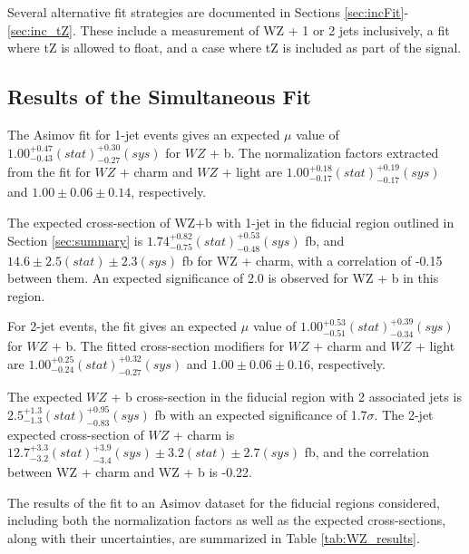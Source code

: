 Several alternative fit strategies are documented in Sections \ref{sec:incFit}-\ref{sec:inc_tZ}. These include a measurement of WZ + 1 or 2 jets inclusively, a fit where tZ is allowed to float, and a case where tZ is included as part of the signal.

\subsection{Results of the Simultaneous Fit}
\label{sec:resSum}

The Asimov fit for 1-jet events gives an expected $\mu$ value of $1.00^{+0.47}_{-0.43}(stat)^{+0.30}_{-0.27}(sys)$ for $WZ$ + b. The normalization factors extracted from the fit for $WZ$ + charm and $WZ$ + light are $1.00^{+0.18}_{-0.17}(stat)^{+0.19}_{-0.17}(sys)$ and $1.00 \pm 0.06 \pm 0.14 $, respectively.

The expected cross-section of WZ+b with 1-jet in the fiducial region outlined in Section \ref{sec:summary} is $1.74^{+0.82}_{-0.75}(stat)^{+0.53}_{-0.48}(sys)$ fb, and $14.6 \pm 2.5 (stat) \pm 2.3 (sys)$ fb for WZ + charm, with a correlation of -0.15 between them. An expected significance of 2.0 is observed for WZ + b in this region. 

For 2-jet events, the fit gives an expected $\mu$ value of $1.00^{+0.53}_{-0.51}(stat)^{+0.39}_{-0.34}(sys)$ for $WZ$ + b. The fitted cross-section modifiers for $WZ$ + charm and $WZ$ + light are $1.00^{+0.25}_{-0.24}(stat)^{+0.32}_{-0.27}(sys)$ and $1.00 \pm 0.06 \pm 0.16 $, respectively.

The expected $WZ$ + b cross-section in the fiducial region with 2 associated jets is $2.5^{+1.3}_{-1.3}(stat)^{+0.95}_{-0.83}(sys)$ fb with an expected significance of 1.7$\sigma$. The 2-jet expected cross-section of $WZ$ + charm is $12.7^{+3.3}_{-3.2}(stat)^{+3.9}_{-3.4}(sys) \pm 3.2 (stat) \pm 2.7 (sys)$ fb, and the correlation between WZ + charm and WZ + b is -0.22. 

The results of the fit to an Asimov dataset for the fiducial regions considered, including both the normalization factors as well as the expected cross-sections, along with their uncertainties, are summarized in Table \ref{tab:WZ_results}.

